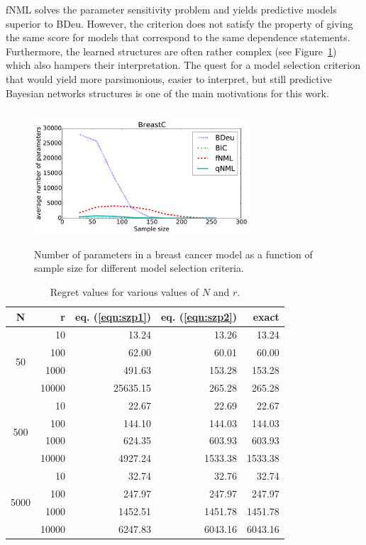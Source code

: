 fNML solves the parameter sensitivity problem and yields predictive
models superior to BDeu.  However, the criterion does not satisfy the
property of giving the same score for models that correspond to the
same dependence statements. Furthermore, the learned structures are
often rather complex (see Figure~\ref{fig:bcnpmean}) which also
hampers their interpretation. The quest for a model selection
criterion that would yield more parsimonious, easier to interpret, but
still predictive Bayesian networks structures is one of the main
motivations for this work.

\begin{figure}
\centering
\includegraphics[width=8cm,height=5cm]{qNML_images/breast_cancer_npmean.pdf}
\caption{Number of parameters in a breast cancer model as a function
  of sample size for different model selection criteria.}
\label{fig:bcnpmean}
\end{figure}



\begin{table}
\caption{Regret values for various values of $N$ and $r$.}
\label{tbl:regrets}
\begin{center}
\begin{tabular}{crrrr}
N & r & eq. (\ref{eqn:szp1}) & eq. (\ref{eqn:szp2}) & exact \\
\midrule
\multirow{4}{*}{50} & 10 & 13.24 & 13.26 & 13.24 \\
& 100 & 62.00 & 60.01 & 60.00 \\
& 1000 & 491.63 & 153.28 & 153.28 \\
& 10000 & 25635.15 & 265.28 & 265.28 \\
\midrule
\multirow{4}{*}{500} & 10 & 22.67 & 22.69 & 22.67 \\
& 100 & 144.10 & 144.03 & 144.03 \\
& 1000 & 624.35 & 603.93 & 603.93 \\
& 10000 & 4927.24 & 1533.38 & 1533.38 \\
\midrule
\multirow{4}{*}{5000} & 10 & 32.74 & 32.76 & 32.74 \\
& 100 & 247.97 & 247.97 & 247.97 \\
& 1000 & 1452.51 & 1451.78 & 1451.78 \\
& 10000 & 6247.83 & 6043.16 & 6043.16 \\
\bottomrule
\end{tabular}
\end{center}
\end{table}
